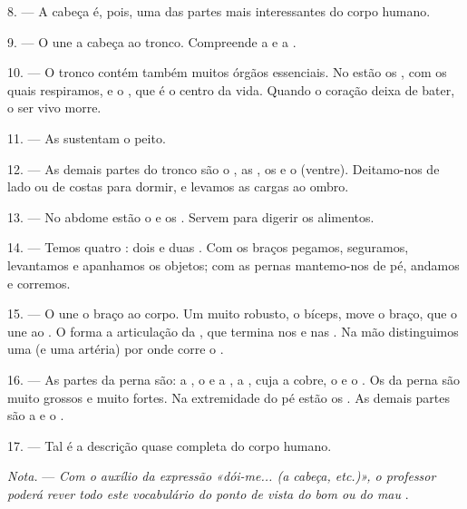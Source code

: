 8. --- A cabeça é, pois, uma das partes mais interessantes do corpo
humano.

\VUsaut{4.4mm}
\VUsaut{3.0mm}

9. --- O  une a cabeça ao tronco. Compreende a
 e a .

10. --- O tronco contém também muitos órgãos essenciais. No 
estão os , com os quais respiramos, e o ,
que é o centro da vida. Quando o coração deixa de bater, o ser vivo
morre.

11. --- As  sustentam o peito.

12. --- As demais partes do tronco são o , as ,
os  e o  (ventre). Deitamo-nos de lado ou de
costas para dormir, e levamos as cargas ao ombro.

13. --- No abdome estão o  e os . Servem
para digerir os alimentos.

\VUsaut{4.4mm}
\VUsaut{3.0mm}

14. --- Temos quatro : dois  e duas
. Com os braços pegamos, seguramos, levantamos e apanhamos
os objetos; com as pernas mantemo-nos de pé, andamos e corremos.

15. --- O  une o braço ao corpo. Um  muito
robusto, o bíceps, move o braço, que o  une ao
. O  forma a articulação da , que
termina nos  e nas . Na mão distinguimos uma
 (e uma artéria) por onde corre o .

16. --- As partes da perna são: a , o  e a
, a , cuja  a
 cobre, o  e o . Os  da
perna são muito grossos e muito fortes. Na extremidade do pé estão os
. As demais partes são a  e o
.

17. --- Tal é a descrição quase completa do corpo humano.

\textit{Nota.} --- \textit{Com o auxílio da expressão «dói-me... (a
cabeça, etc.)», o professor poderá rever todo este vocabulário do ponto
de vista do bom ou do mau} .

